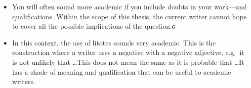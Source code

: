 \begin{itemize}
\item You will often sound more academic if you include doubts in your work---and qualifications. Within the scope of this thesis, the current writer cannot hope to cover all the possible implications of the question.ԍ
\item In this context, the use of litotes sounds very academic. This is the construction where a writer uses a negative with a negative adjective, e.g.\ it is not unlikely that \ldots This does not mean the same as it is probable that \ldots It has a shade of meaning and qualification that can be useful to academic writers.
\end{itemize}




